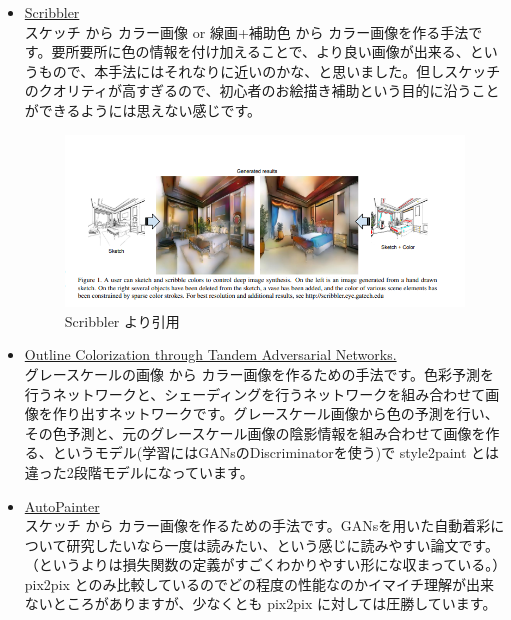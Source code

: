 \documentclass[a4paper, dvipdfmx, 10pt]{article}
\begin{document}
\begin{itemize}
\item \href{https://arxiv.org/abs/1612.00835}{Scribbler}\\

スケッチ から カラー画像 or 線画+補助色 から カラー画像を作る手法です。要所要所に色の情報を付け加えることで、より良い画像が出来る、というもので、本手法にはそれなりに近いのかな、と思いました。但しスケッチのクオリティが高すぎるので、初心者のお絵描き補助という目的に沿うことができるようには思えない感じです。\\
\begin{figure}[htbp]
\centering
\includegraphics[width=.9\linewidth]{./img/scribbler_abst.png}
\caption{Scribbler より引用}
\end{figure}

\item \href{https://arxiv.org/pdf/1704.08834.pdf}{Outline Colorization through Tandem Adversarial Networks.}\\

グレースケールの画像 から カラー画像を作るための手法です。色彩予測を行うネットワークと、シェーディングを行うネットワークを組み合わせて画像を作り出すネットワークです。グレースケール画像から色の予測を行い、その色予測と、元のグレースケール画像の陰影情報を組み合わせて画像を作る、というモデル(学習にはGANsのDiscriminatorを使う)で style2paint とは違った2段階モデルになっています。\\

\item \href{https://arxiv.org/pdf/1705.01908.pdf}{AutoPainter}\\

スケッチ から カラー画像を作るための手法です。GANsを用いた自動着彩について研究したいなら一度は読みたい、という感じに読みやすい論文です。（というよりは損失関数の定義がすごくわかりやすい形にな収まっている。）pix2pix とのみ比較しているのでどの程度の性能なのかイマイチ理解が出来ないところがありますが、少なくとも pix2pix に対しては圧勝しています。\\


\end{itemize}
\end{document}
